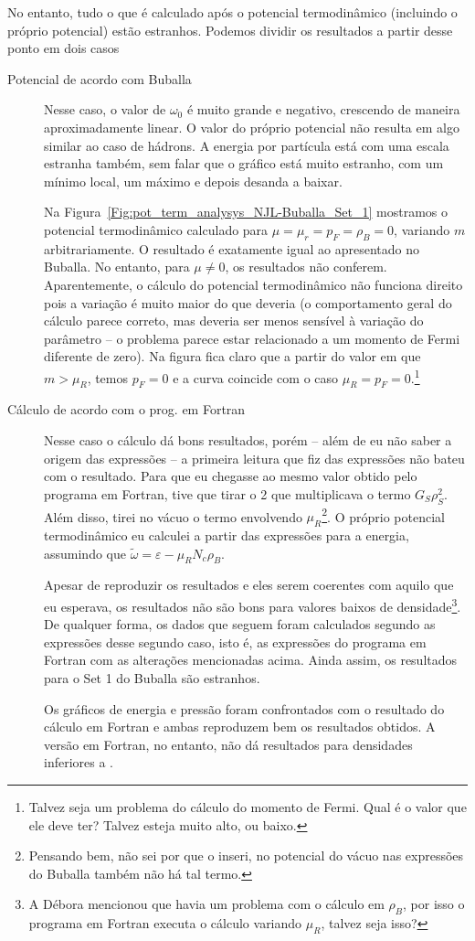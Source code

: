 No entanto, tudo o que é calculado após o potencial termodinâmico (incluindo o próprio potencial) estão estranhos. Podemos dividir os resultados a partir desse ponto em dois casos
\begin{description}
	\item[Potencial de acordo com Buballa] Nesse caso, o valor de $\omega_0$ é muito grande e negativo, crescendo de maneira aproximadamente linear. O valor do próprio potencial não resulta em algo similar ao caso de hádrons. A energia por partícula está com uma escala estranha também, sem falar que o gráfico está muito estranho, com um mínimo local, um máximo e depois desanda a baixar.

Na Figura~\ref{Fig:pot_term_analysys_NJL-Buballa_Set_1} mostramos o potencial termodinâmico calculado para $\mu = \mu_r = p_F = \rho_B = 0$, variando $m$ arbitrariamente. O resultado é exatamente igual ao apresentado no Buballa. No entanto, para $\mu \neq 0$, os resultados não conferem. Aparentemente, o cálculo do potencial termodinâmico não funciona direito pois a variação é muito maior do que deveria (o comportamento geral do cálculo parece correto, mas deveria ser menos sensível à variação do parâmetro -- o problema parece estar relacionado a um momento de Fermi diferente de zero). Na figura fica claro que a partir do valor em que $m > \mu_R$, temos $p_F = 0$ e a curva coincide com o caso $\mu_R = p_F = 0$.\footnote{Talvez seja um problema do cálculo do momento de Fermi. Qual é o valor que ele deve ter? Talvez esteja muito alto, ou baixo.}

	\item[Cálculo de acordo com o prog. em Fortran] Nesse caso o cálculo dá bons resultados, porém -- além de eu não saber a origem das expressões -- a primeira leitura que fiz das expressões não bateu com o resultado. Para que eu chegasse ao mesmo valor obtido pelo programa em Fortran, tive que tirar o 2 que multiplicava o termo $G_S \rho_S^2$. Além disso, tirei no vácuo o termo envolvendo $\mu_R$\footnote{Pensando bem, não sei por que o inseri, no potencial do vácuo nas expressões do Buballa também não há tal termo.}. O próprio potencial termodinâmico eu calculei a partir das expressões para a energia, assumindo que $\tilde{\omega} = \varepsilon - \mu_R N_c \rho_B$.
	
	Apesar de reproduzir os resultados e eles serem coerentes com aquilo que eu esperava, os resultados não são bons para valores baixos de densidade\footnote{A Débora mencionou que havia um problema com o cálculo em $\rho_B$, por isso o programa em Fortran executa o cálculo variando $\mu_R$, talvez seja isso?}. De qualquer forma, os dados que seguem foram calculados segundo as expressões desse segundo caso, isto é, as expressões do programa em Fortran com as alterações mencionadas acima. Ainda assim, os resultados para o Set 1 do Buballa são estranhos.
	
	Os gráficos de energia e pressão foram confrontados com o resultado do cálculo em Fortran e ambas reproduzem bem os resultados obtidos. A versão em Fortran, no entanto, não dá resultados para densidades inferiores a .
\end{description}   

